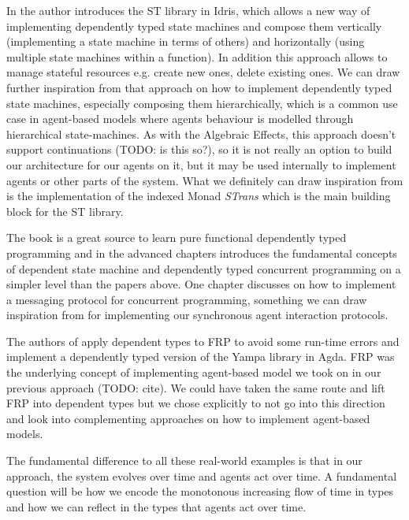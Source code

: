 In \cite{brady_state_2016} the author introduces the ST library in Idris, which allows a new way of implementing dependently typed state machines and compose them vertically (implementing a state machine in terms of others) and horizontally (using multiple state machines within a function). In addition this approach allows to manage stateful resources e.g. create new ones, delete existing ones. We can draw further inspiration from that approach on how to implement dependently typed state machines, especially composing them hierarchically, which is a common use case in agent-based models where agents behaviour is modelled through hierarchical state-machines. As with the Algebraic Effects, this approach doesn't support continuations (TODO: is this so?), so it is not really an option to build our architecture for our agents on it, but it may be used internally to implement agents or other parts of the system. What we definitely can draw inspiration from is the implementation of the indexed Monad \textit{STrans} which is the main building block for the ST library.

The book \cite{brady_type-driven_2017} is a great source to learn pure functional dependently typed programming and in the advanced chapters introduces the fundamental concepts of dependent state machine and dependently typed concurrent programming on a simpler level than the papers above. One chapter discusses on how to implement a messaging protocol for concurrent programming, something we can draw inspiration from for implementing our synchronous agent interaction protocols.

The authors of \cite{sculthorpe_safe_2009} apply dependent types to FRP to avoid some run-time errors and implement a dependently typed version of the Yampa library in Agda. FRP was the underlying concept of implementing agent-based model we took on in our previous approach (TODO: cite). We could have taken the same route and lift FRP into dependent types but we chose explicitly to not go into this direction and look into complementing approaches on how to implement agent-based models.

The fundamental difference to all these real-world examples is that in our approach, the system evolves over time and agents act over time. A fundamental question will be how we encode the monotonous increasing flow of time in types and how we can reflect in the types that agents act over time.


